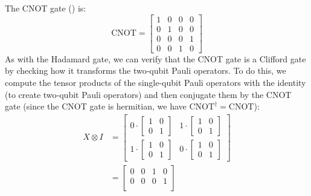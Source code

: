 \highspace
\begin{examplebox}
    The CNOT gate () is:
    \begin{equation*}
        \text{CNOT} =
        \begin{bmatrix}
            1 & 0 & 0 & 0 \\
            0 & 1 & 0 & 0 \\
            0 & 0 & 0 & 1 \\
            0 & 0 & 1 & 0
        \end{bmatrix}
    \end{equation*}
    As with the Hadamard gate, we can verify that the CNOT gate is a Clifford gate by checking how it transforms the two-qubit Pauli operators. To do this, we compute the tensor products of the single-qubit Pauli operators with the identity (to create two-qubit Pauli operators) and then conjugate them by the CNOT gate (since the CNOT gate is hermitian, we have $\text{CNOT}^\dagger = \text{CNOT}$):
    \begin{equation*}
        \begin{aligned}
            X \otimes I &= 
            \begin{bmatrix}
                0 \cdot \begin{bmatrix}
                    1 & 0 \\
                    0 & 1
                \end{bmatrix} &
                1 \cdot \begin{bmatrix}
                    1 & 0 \\
                    0 & 1
                \end{bmatrix} \\
                1 \cdot \begin{bmatrix}
                    1 & 0 \\
                    0 & 1
                \end{bmatrix} &
                0 \cdot \begin{bmatrix}
                    1 & 0 \\
                    0 & 1
                \end{bmatrix}
            \end{bmatrix} \\
            &=
            \begin{bmatrix}
                0 & 0 & 1 & 0 \\
                0 & 0 & 0 & 1 \\

\end{bmatrix}
\end{aligned}
\end{equation*}
\end{examplebox}
